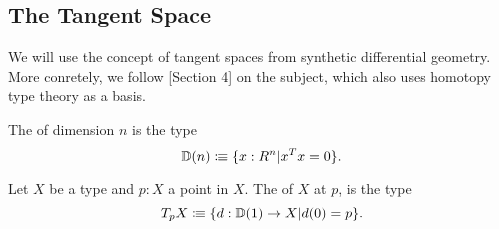 \subsection{The Tangent Space}

We will use the concept of tangent spaces from synthetic differential geometry.
More conretely, we follow \cite{david-orbifolds}[Section 4]
on the subject, which also uses homotopy type theory as a basis.

\begin{definition}
  The  of dimension $n$ is the type
  \[ \D(n)\colonequiv \{x:R^n\vert x^Tx=0\}\rlap{.}\]
\end{definition}

\begin{definition}
  Let $X$ be a type and $p:X$ a point in $X$.
  The  of $X$ at $p$, is the type
  \[ T_pX\colonequiv \{d:\D(1)\to X\vert d(0)=p \}\rlap{.}\]
\end{definition}